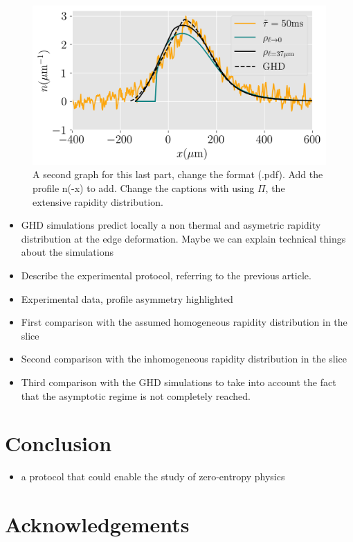 \documentclass[submission, Phys]{SciPost}
\begin{document}
 \begin{figure}[!htb]
     \centering
     \includegraphics[width=0.8\linewidth]{Figures/asymetrie_GHD_all.png}
     \caption{A second graph for this last part, change the format (.pdf). Add the profile n(-x) to add. Change the captions with using $\Pi$, the extensive rapidity distribution.}
     \label{fig:local}
 \end{figure}

 \begin{itemize}
     \item GHD simulations predict locally a non thermal and asymetric rapidity distribution at the edge deformation. Maybe we can explain technical things about the simulations
     \item Describe the experimental protocol, referring to the previous article.  
     \item Experimental data, profile asymmetry highlighted
     \item First comparison with the assumed homogeneous rapidity distribution in the slice
     \item Second comparison with the inhomogeneous rapidity distribution in the slice
     \item Third comparison with the GHD simulations to take into account the fact that the asymptotic regime is not completely reached.
 \end{itemize}

\section{Conclusion}
\begin{itemize}
    \item a protocol that could enable the study of zero-entropy physics
\end{itemize}

\section*{Acknowledgements}
\end{document}
